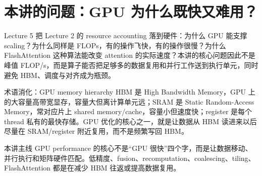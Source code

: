 \section{本讲的问题：GPU 为什么既快又难用？}
Lecture 5 把 Lecture 2 的 resource accounting 落到硬件：为什么 GPU 能支撑 scaling？为什么同样是 FLOPs，有的操作飞快，有的操作很慢？为什么 FlashAttention 这种算法能改变 attention 的实际速度？本讲的核心问题因此不是峰值 FLOP/s，而是算子能否把足够多的数据复用和并行工作送到执行单元，同时避免 HBM、调度与对齐成为瓶颈。
\begin{knowledgebox}{术语消化：GPU memory hierarchy}
HBM 是 High Bandwidth Memory，GPU 上的大容量高带宽显存，容量大但离计算单元远；SRAM 是 Static Random-Access Memory，常对应片上 shared memory/cache，容量小但速度快；register 是每个 thread 私有的最快存储。GPU 优化的核心之一，就是让数据从 HBM 读进来以后尽量在 SRAM/register 附近复用，而不是频繁写回 HBM。
\end{knowledgebox}
\begin{importantbox}{本讲主线}
GPU performance 的核心不是“GPU 很快”四个字，而是让数据移动、并行执行和矩阵硬件匹配。低精度、fusion、recomputation、coalescing、tiling、FlashAttention 都是在减少 HBM 往返或提高数据复用。
\end{importantbox}
